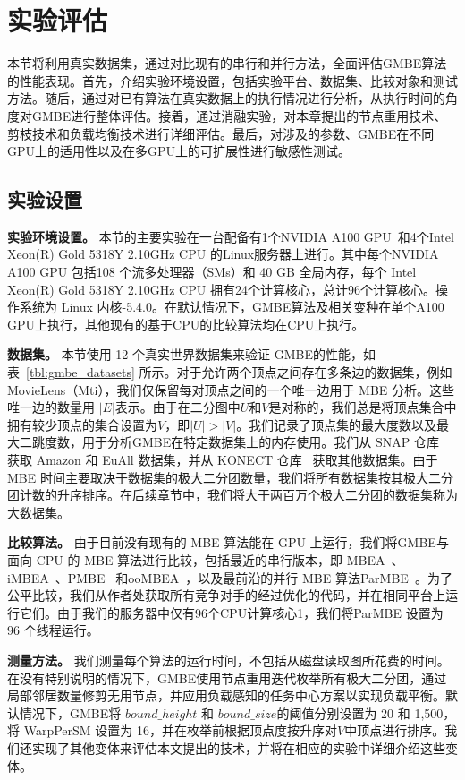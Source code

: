 \section{实验评估}
本节将利用真实数据集，通过对比现有的串行和并行方法，全面评估GMBE算法的性能表现。首先，介绍实验环境设置，包括实验平台、数据集、比较对象和测试方法。随后，通过对已有算法在真实数据上的执行情况进行分析，从执行时间的角度对GMBE进行整体评估。接着，通过消融实验，对本章提出的节点重用技术、剪枝技术和负载均衡技术进行详细评估。最后，对涉及的参数、GMBE在不同GPU上的适用性以及在多GPU上的可扩展性进行敏感性测试。

\subsection{实验设置}

\textbf{实验环境设置。} 本节的主要实验在一台配备有1个NVIDIA A100 GPU~\cite{NVIDIA-A100}和4个Intel Xeon(R) Gold 5318Y 2.10GHz CPU 的Linux服务器上进行。其中每个NVIDIA A100 GPU 包括108 个流多处理器（SMs）和 40 GB 全局内存，每个 Intel Xeon(R) Gold 5318Y 2.10GHz CPU 拥有24个计算核心，总计96个计算核心。操作系统为 Linux 内核-5.4.0。在默认情况下，GMBE算法及相关变种在单个A100 GPU上执行，其他现有的基于CPU的比较算法均在CPU上执行。



\textbf{数据集。} 本节使用 12 个真实世界数据集来验证 GMBE的性能，如表~\ref{tbl:gmbe_datasets} 所示。对于允许两个顶点之间存在多条边的数据集，例如 MovieLens（Mti），我们仅保留每对顶点之间的一个唯一边用于 MBE 分析。这些唯一边的数量用 $|E|$表示。由于在二分图中$U$和$V$是对称的，我们总是将顶点集合中拥有较少顶点的集合设置为$V$，即$|U|>|V|$。我们记录了顶点集的最大度数以及最大二跳度数，用于分析GMBE在特定数据集上的内存使用。我们从 SNAP 仓库~\cite{snapnets} 获取 Amazon 和 EuAll 数据集，并从 KONECT 仓库~\cite{konect} 获取其他数据集。由于 MBE 时间主要取决于数据集的极大二分团数量，我们将所有数据集按其极大二分团计数的升序排序。在后续章节中，我们将大于两百万个极大二分团的数据集称为大数据集。

\textbf{比较算法。} 由于目前没有现有的 MBE 算法能在 GPU 上运行，我们将GMBE与面向 CPU 的 MBE 算法进行比较，包括最近的串行版本，即 MBEA~\cite{iMBEA14}、iMBEA~\cite{iMBEA14}、PMBE~\cite{PMBE20} 和ooMBEA~\cite{ooMBE22}，以及最前沿的并行 MBE 算法ParMBE~\cite{parMBE18}。为了公平比较，我们从作者处获取所有竞争对手的经过优化的代码，并在相同平台上运行它们。由于我们的服务器中仅有96个CPU计算核心1，我们将ParMBE 设置为 96 个线程运行。

\textbf{测量方法。} 我们测量每个算法的运行时间，不包括从磁盘读取图所花费的时间。在没有特别说明的情况下，GMBE使用节点重用迭代枚举所有极大二分团，通过局部邻居数量修剪无用节点，并应用负载感知的任务中心方案以实现负载平衡。默认情况下，GMBE将 $bound\_height$ 和 $bound\_size$的阈值分别设置为 20 和 1,500，将 \textsf{WarpPerSM} 设置为 16，并在枚举前根据顶点度按升序对$V$中顶点进行排序。我们还实现了其他变体来评估本文提出的技术，并将在相应的实验中详细介绍这些变体。


